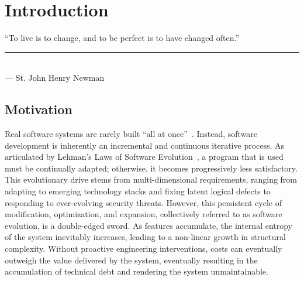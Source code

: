 
\chapter{Introduction} %
\label{ch:chapter1} 
\begin{flushright}
    \begin{minipage}{0.4\textwidth}
        ``To live is to change, and to be perfect is to have changed often.'' \\
        \rule{\textwidth}{0.4pt} \\
        \null\hfill --- St. John Henry Newman
    \end{minipage}
\end{flushright}

\section{Motivation}\label{sec:motivation}

Real software systems are rarely built ``all at once''~\cite{li2017managing}. Instead, software development is inherently an incremental and continuous iterative process. As articulated by Lehman's Laws of Software Evolution~\cite{lehman1996laws}, a program that is used must be continually adapted; otherwise, it becomes progressively less
satisfactory. This evolutionary drive stems from multi-dimensional requirements, ranging from adapting to emerging technology stacks and fixing latent logical defects to responding to ever-evolving security threats. However, this persistent cycle of modification, optimization, and expansion, collectively referred to as software evolution, is a double-edged sword. As features accumulate, the internal entropy of the system inevitably increases, leading to a non-linear growth in structural complexity. Without proactive engineering interventions, costs can eventually outweigh the value delivered by the system, eventually resulting in the accumulation of technical debt and rendering the system unmaintainable.

